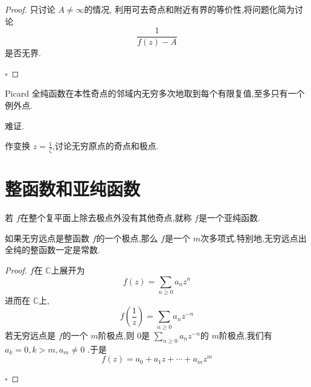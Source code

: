 \documentclass[../../复变函数.tex]{subfiles}
\begin{document}
\begin{proof}
    只讨论 \(  A\neq \infty  \)的情况, 利用可去奇点和附近有界的等价性,将问题化简为讨论 \[
    \frac{1 }{f\left( z \right)-A  } 
    \]是否无界.

    \hfill $\square$
\end{proof}

\begin{theorem}{Picard}
    全纯函数在本性奇点的邻域内无穷多次地取到每个有限复值,至多只有一个例外点.
\end{theorem}
\begin{remark}
    难证.
\end{remark}

\begin{definition}
    作变换 \(  z= \frac{1 }{\zeta  }   \),讨论无穷原点的奇点和极点. 
\end{definition}

\section{整函数和亚纯函数}

\begin{definition}\label{6.18-1}
    若 \(  f  \)在整个复平面上除去极点外没有其他奇点,就称 \(  f  \)是一个亚纯函数.  
\end{definition}


\begin{theorem}
    如果无穷远点是整函数 \(  f  \)的一个极点,那么 \(  f  \)是一个 \(  m  \)次多项式.特别地,无穷远点出全纯的整函数一定是常数.   
\end{theorem}

\begin{proof}

    \(  f  \)在 \(  \mathbb{C}   \)上展开为 \[
    f\left( z \right)= \sum _{n\ge 0}a_{n}z^{n} 
    \]  进而在 \(  \mathbb{C}   \)上, \[
    f\left( \frac{1 }{z }  \right)=  \sum _{n\ge 0}a_{n}z^{-n} 
    \] 
    若无穷远点是 \(  f  \)的一个 \(  m  \)阶极点,则 \(  0  \)是 \(  \sum _{n\ge 0}a_{n}z^{-n}  \)的 \(  m  \)阶极点,我们有 \(  a_{k}= 0,k> m ,a_{m}\neq 0  \)    .于是 \[
    f\left( z \right)= a_0+ a_1z+ \cdots + a_{m}z^{m} 
    \]

    \hfill $\square$
\end{proof}
\end{document}
